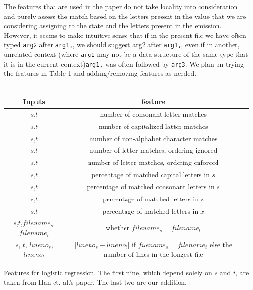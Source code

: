 \documentclass[10pt]{article}
\makeatletter
\newenvironment{tablehere}
  {\def\@captype{table}}
  {}
\makeatother
\begin{document}
The features that are used in the paper do not take locality into consideration and purely assess the match based on the letters present in the value that we are considering assigning to the state and the letters present in the emission. However, it seems to make intuitive sense that if in the present file we have often typed \texttt{arg2} after \texttt{arg1,}, we should suggest arg2 after \texttt{arg1,}, even if in another, unrelated context (where \texttt{arg1} may not be a data structure of the same type that it is in the current context)\texttt{arg1,} was often followed by \texttt{arg3}. We plan on trying the features in Table 1 and adding/removing features as needed.
\\\\
\begin{tablehere}
\begin{tabular}{c c c} 
\hline
Inputs & feature & \\
\hline %
$s$,$t$ & number of consonant letter matches\\ %
$s$,$t$ & number of capitalized latter matches\\
$s$,$t$ & number of non-alphabet character matches\\
$s$,$t$ & number of letter matches, ordering ignored \\
$s$,$t$ & number of letter matches, ordering enforced \\
$s$,$t$ & percentage of matched capital letters in $s$ \\ 
$s$,$t$ & percentage of matched consonant letters in $s$ \\
$s$,$t$ & percentage of matched letters in $s$ \\
$s$,$t$ & percentage of matched letters in $x$ \\
$s$,$t$,$filename_s$, $filename_t$ & whether $filename_s=filename_t$ \\
$s$, $t$, $lineno_s$, $lineno_t$ & $|lineno_s-lineno_t|$ if $filename_s=filename_t$ else the number of lines in the longest file\\
\end{tabular}
\caption{Features for logistic regression. The first nine, which depend solely on $s$ and $t$, are taken from Han et. al.'s paper. The last two are our addition.\\\\}
\end{tablehere}
\end{document}
